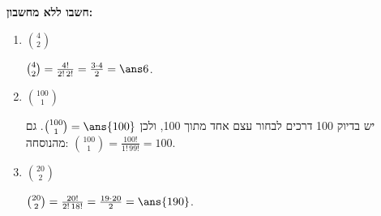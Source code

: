 \textbf{חשבו ללא מחשבון:}
\begin{enumerate}
\item $\binom42$
\begin{solbox}
$\binom42=\frac{4!}{2!\,2!}=\frac{3\cdot4}{2}=\ans6$.
\end{solbox}
\item $\binom{100}1$
\begin{solbox}
יש בדיוק 100 דרכים לבחור עצם אחד מתוך 100, ולכן $\binom{100}1=\ans{100}$. גם מהנוסחה: $\binom{100}1=\frac{100!}{1!\,99!}=100$.
\end{solbox}
\item $\binom{20}2$
\begin{solbox}
$\binom{20}2=\frac{20!}{2!\,18!}=\frac{19\cdot20}2=\ans{190}$.
\end{solbox}
\end{enumerate}

